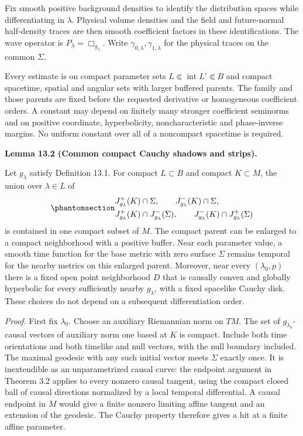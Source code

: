 \documentclass[
  english,
  11pt,
  reqno]{amsart}
\makeatletter
\newcommand{\pandocstatementheading}[1]{%
  \par\addpenalty{\@beginparpenalty}%
  \addvspace{.5\baselineskip plus .2\baselineskip minus .2\baselineskip}%
  {\normalfont\bfseries #1\par}%
  \nobreak\@afterindenttrue\@afterheading
}
\makeatother
\begin{document}
Fix smooth positive background densities to identify the distribution
spaces while differentiating in \(\lambda\). Physical volume densities
and the field and future-normal half-density traces are then smooth
coefficient factors in these identifications. The wave operator is
\(P_\lambda=\Box_{g_\lambda}\). Write
\(\gamma_{0,\lambda},\gamma_{1,\lambda}\) for the physical traces on the
common \(\Sigma\).

Every estimate is on compact parameter sets
\(L\Subset\operatorname{int}L'\Subset B\) and compact spacetime, spatial
and angular sets with larger buffered parents. The family and those
parents are fixed before the requested derivative or homogeneous
coefficient orders. A constant may depend on finitely many stronger
coefficient seminorms and on positive coordinate, hyperbolicity,
noncharacteristic and phase-inverse margins. No uniform constant over
all of a noncompact spacetime is required.

\pandocstatementheading{\protect{}\label{lem:family-compact-cauchy-parents}Lemma 13.2 (Common compact Cauchy shadows and strips).}

Let \(g_\lambda\) satisfy Definition 13.1. For compact \(L\subset B\)
and compact \(K\subset M\), the union over \(\lambda\in L\) of
\begin{equation}\protect\phantomsection\label{eq:family-common-causal-strips}{
\begin{aligned}
&J^+_{g_\lambda}(K)\cap\Sigma,
\qquad J^-_{g_\lambda}(K)\cap\Sigma,\\
&J^+_{g_\lambda}(K)\cap J^-_{g_\lambda}(\Sigma),
\qquad J^-_{g_\lambda}(K)\cap J^+_{g_\lambda}(\Sigma)
\end{aligned}
}\end{equation} is contained in one compact subset of \(M\). The compact
parent can be enlarged to a compact neighborhood with a positive buffer.
Near each parameter value, a smooth time function for the base metric
with zero surface \(\Sigma\) remains temporal for the nearby metrics on
this enlarged parent. Moreover, near every \((\lambda_0,p)\) there is a
fixed open point neighborhood \(D\) that is causally convex and globally
hyperbolic for every sufficiently nearby \(g_\lambda\), with a fixed
spacelike Cauchy disk. These choices do not depend on a subsequent
differentiation order.

\emph{Proof.} First fix \(\lambda_0\). Choose an auxiliary Riemannian
norm on \(TM\). The set of \(g_{\lambda_0}\)-causal vectors of auxiliary
norm one based at \(K\) is compact. Include both time orientations and
both timelike and null vectors, with the null boundary included. The
maximal geodesic with any such initial vector meets \(\Sigma\) exactly
once. It is inextendible as an unparametrized causal curve: the endpoint
argument in Theorem 3.2 applies to every nonzero causal tangent, using
the compact closed ball of causal directions normalized by a local
temporal differential. A causal endpoint in \(M\) would give a finite
nonzero limiting affine tangent and an extension of the geodesic. The
Cauchy property therefore gives a hit at a finite affine parameter.
\end{document}
